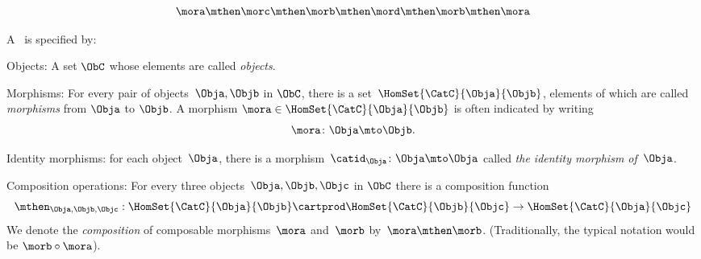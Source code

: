 {\begin{forslides}
\begin{equation}
        \end{equation}
        \begin{equation}
            \label{eq:14}
            \mora \mthen  \morc \mthen \morb  \mthen \mord \mthen \morb  \mthen \mora
        \end{equation}
        \begin{ctdefinition}
            \label{def:category-var}
            A \emph{}~\CatC is specified by:
            \begin{body}
                \constit
                \begin{compactenum}
                    \item Objects: A set $\ObC$ whose elements are called \emph{objects}.
                    \item Morphisms: For every pair of objects~$\Obja,\Objb$ in $\ObC$, there is a set~$\HomSet{\CatC}{\Obja}{\Objb}$, elements of which are called \emph{morphisms} from $\Obja$ to $\Objb$.
                    A morphism $\mora \in \HomSet{\CatC}{\Obja}{\Objb}$ is often indicated by writing
                    \begin{equation*}
                        \mora \colon \Obja \mto \Objb.
                    \end{equation*}
                    \item Identity morphisms: for each object~$\Obja$, there is a morphism~$\catid_{\Obja}\colon \Obja \mto \Obja$  called \emph{the identity morphism of~$\Obja$}.
                    \item Composition operations: For every three objects~$\Obja,\Objb,\Objc$ in $\ObC$ there is a composition function
                    \begin{equation*}
                        \mthen_{\Obja,\Objb,\Objc}: \HomSet{\CatC}{\Obja}{\Objb} \cartprod \HomSet{\CatC}{\Objb}{\Objc}\to \HomSet{\CatC}{\Obja}{\Objc}
                    \end{equation*}
                    We denote the \emph{composition} of composable morphisms~$\mora$ and~$\morb$ by~$\mora \mthen \morb$. (Traditionally, the typical notation would be $\morb \circ \mora$).
                

\end{compactenum}
\end{body}
\end{ctdefinition}
\end{forslides}}
